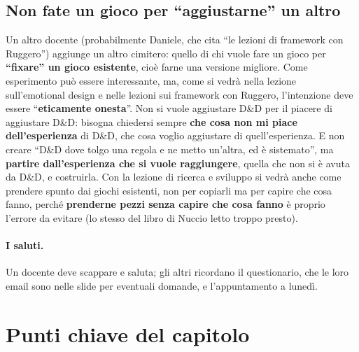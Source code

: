 \subsection{Non fate un gioco per ``aggiustarne'' un altro}

Un altro docente (probabilmente Daniele, che cita ``le lezioni di framework con Ruggero'') aggiunge un altro cimitero: quello di chi vuole fare un gioco per
\textbf{``fixare'' un gioco esistente}, cioè farne una versione migliore. Come
esperimento può essere interessante, ma, come si vedrà nella lezione
sull'emotional design e nelle lezioni sui framework con Ruggero, l'intenzione deve
essere ``\textbf{eticamente onesta}''. Non si vuole aggiustare D\&D per il piacere
di aggiustare D\&D: bisogna chiedersi sempre \textbf{che cosa non mi piace
dell'esperienza} di D\&D, che cosa voglio aggiustare di quell'esperienza. E non
creare ``D\&D dove tolgo una regola e ne metto un'altra, ed è sistemato'', ma
\textbf{partire dall'esperienza che si vuole raggiungere}, quella che non si è
avuta da D\&D, e costruirla. Con la lezione di ricerca e sviluppo si vedrà anche
come prendere spunto dai giochi esistenti, non per copiarli ma per capire che
cosa fanno, perché \textbf{prenderne pezzi senza capire che cosa fanno} è proprio
l'errore da evitare (lo stesso del libro di Nuccio letto troppo presto).

\paragraph{I saluti.} Un docente deve scappare e saluta; gli altri ricordano il
questionario, che le loro email sono nelle slide per eventuali domande, e
l'appuntamento a lunedì.

\section*{Punti chiave del capitolo}


